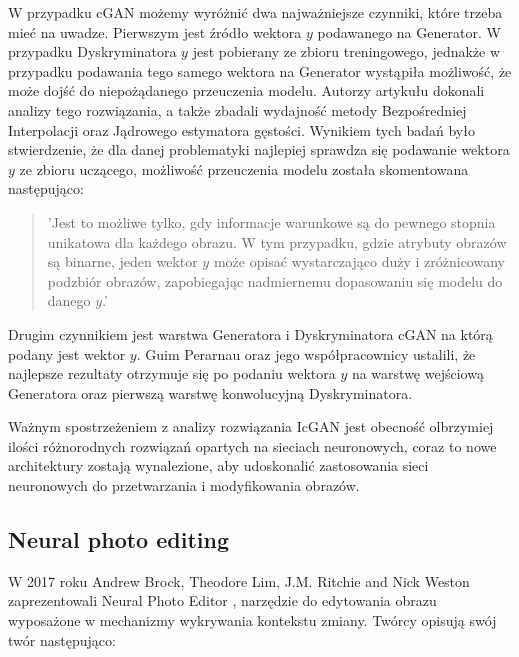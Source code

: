     W przypadku cGAN możemy wyróżnić dwa najważniejsze czynniki, które trzeba
    mieć na uwadze. Pierwszym jest źródło wektora $y$ podawanego na
    Generator. W przypadku Dyskryminatora $y$ jest pobierany ze
    zbioru treningowego, jednakże w przypadku podawania tego
    samego wektora na Generator wystąpiła możliwość, że może dojść do niepożądanego
    przeuczenia modelu. Autorzy artykułu dokonali analizy tego rozwiązania,
    a także zbadali wydajność metody Bezpośredniej Interpolacji oraz
    Jądrowego estymatora gęstości. Wynikiem tych badań było stwierdzenie, że
    dla danej problematyki najlepiej sprawdza się podawanie wektora $y$ ze zbioru
    uczącego, możliwość przeuczenia modelu została skomentowana następująco:
    \begin{quote}
      'Jest to możliwe tylko, gdy informacje warunkowe są do pewnego stopnia
      unikatowa dla każdego obrazu. W tym przypadku, gdzie atrybuty obrazów są
      binarne, jeden wektor $y$ może opisać wystarczająco duży i zróżnicowany
      podzbiór obrazów, zapobiegając nadmiernemu dopasowaniu się modelu do
      danego $y$.'
    \end{quote}
    Drugim czynnikiem jest warstwa Generatora i Dyskryminatora cGAN na
    którą podany jest wektor $y$. Guim Perarnau oraz jego współpracownicy ustalili, że najlepsze rezultaty otrzymuje się po podaniu wektora $y$ na warstwę wejściową
    Generatora oraz pierwszą warstwę konwolucyjną Dyskryminatora.

    Ważnym spostrzeżeniem z analizy rozwiązania IcGAN jest obecność
    olbrzymiej ilości różnorodnych rozwiązań opartych na sieciach neuronowych,
    coraz to nowe architektury zostają wynalezione, aby udoskonalić
    zastosowania sieci neuronowych do przetwarzania i modyfikowania obrazów.

  \subsection{Neural photo editing}
    W 2017 roku Andrew Brock, Theodore Lim, J.M. Ritchie and Nick Weston
    zaprezentowali Neural Photo Editor \cite{neural_photo_editor}, narzędzie
    do edytowania obrazu wyposażone w mechanizmy wykrywania kontekstu zmiany.
    Twórcy opisują swój twór następująco:

